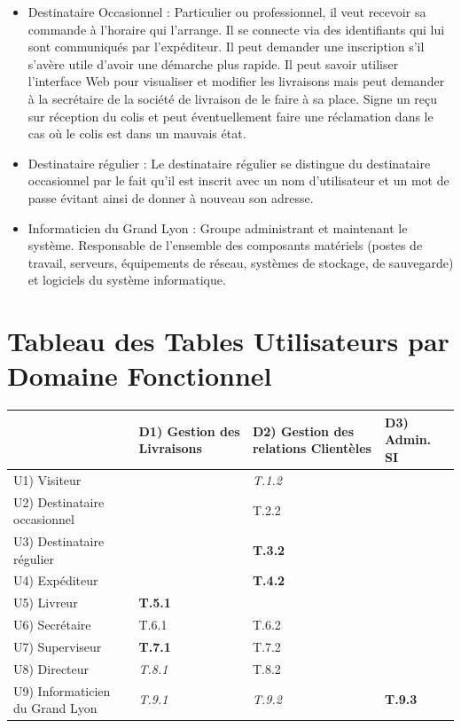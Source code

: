 \documentclass{report}
\begin{document}
\begin{itemize}
\item{Destinataire Occasionnel :} Particulier ou professionnel, il veut recevoir sa commande à l’horaire qui l’arrange. Il se connecte via des identifiants qui lui sont communiqués par l’expéditeur. Il peut demander une inscription s’il s’avère utile d’avoir une démarche plus rapide. Il peut savoir utiliser l’interface Web pour visualiser et modifier les livraisons mais peut demander à la secrétaire de la société de livraison de le faire à sa place. Signe un reçu sur réception du colis et peut éventuellement faire une réclamation dans le cas où le colis est dans un mauvais état.\\


\item{Destinataire régulier :} Le destinataire régulier se distingue du destinataire occasionnel par le fait qu’il est inscrit avec un nom d’utilisateur et un mot de passe évitant ainsi de donner à nouveau son adresse.\\

\item{Informaticien du Grand Lyon :} Groupe administrant et maintenant le système. Responsable de l’ensemble des composants matériels (postes de travail, serveurs, équipements de réseau, systèmes de stockage, de sauvegarde) et logiciels du système informatique.\\

\end{itemize}

\section{Tableau des Tables Utilisateurs par Domaine Fonctionnel}

\begin{tabular}{|p{5cm}|p{3cm}|p{3cm}|p{3cm}|}
\hline
&D1) Gestion des Livraisons & D2) Gestion des relations Clientèles & D3) Admin. SI\\
\hline
U1) Visiteur&&\textit{T.1.2}&\\
\hline
U2) Destinataire occasionnel&&T.2.2&\\
\hline
U3) Destinataire régulier &&\textbf{T.3.2}&\\
\hline
U4) Expéditeur&&\textbf{T.4.2}&\\
\hline
U5) Livreur&\textbf{T.5.1}&&\\
\hline
U6) Secrétaire&T.6.1&T.6.2&\\
\hline
U7) Superviseur&\textbf{T.7.1}&T.7.2&\\
\hline
U8) Directeur&\textit{T.8.1}&T.8.2&\\
\hline
U9) Informaticien du Grand Lyon&\textit{T.9.1}&\textit{T.9.2}&\textbf{T.9.3}\\
\hline
\end{tabular}
\end{document}

